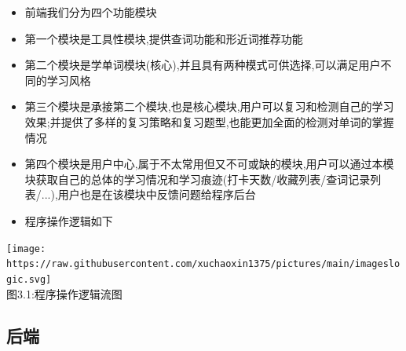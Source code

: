 \documentclass[
]{article}
\begin{document}
\begin{itemize}
\item
  前端我们分为四个功能模块
\item
  第一个模块是工具性模块,提供查词功能和形近词推荐功能
\item
  第二个模块是学单词模块(核心),并且具有两种模式可供选择,可以满足用户不同的学习风格
\item
  第三个模块是承接第二个模块,也是核心模块,用户可以复习和检测自己的学习效果;并提供了多样的复习策略和复习题型,也能更加全面的检测对单词的掌握情况
\item
  第四个模块是用户中心,属于不太常用但又不可或缺的模块,用户可以通过本模块获取自己的总体的学习情况和学习痕迹(打卡天数/收藏列表/查词记录列表/...),用户也是在该模块中反馈问题给程序后台
\item
  程序操作逻辑如下
\end{itemize}

\texttt{[image: https://raw.githubusercontent.com/xuchaoxin1375/pictures/main/imageslogic.svg]}\\
图3.1:程序操作逻辑流图

\hypertarget{ux540eux7aef}{%
\subsection{后端}\label{ux540eux7aef}}
\end{document}
